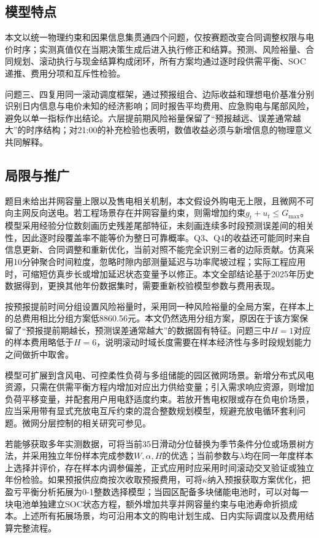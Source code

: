 

\subsection{模型特点}
本文以统一物理约束和因果信息集贯通四个问题，仅按赛题改变合同调整权限与电价时序；实测真值仅在当期决策生成后进入执行修正和结算。预测、风险裕量、合同规划、滚动执行与现金结算构成闭环，所有方案均通过逐时段供需平衡、SOC递推、费用分项和互斥性检验。

问题三、四复用同一滚动调度框架，通过预报组合、边际收益和理想电价基准分别识别日内信息与电价未知的经济影响；同时报告平均费用、应急购电与尾部风险，避免以单一指标作出结论。六层提前期风险裕量保留了“预报越远、误差通常越大”的时序结构；对21:00的补充检验也表明，数值收益必须与新增信息的物理意义共同解释。

\subsection{局限与推广}
题目未给出并网容量上限以及售电相关机制，本文假设外购电无上限，且微网不可向主网反向送电。若工程场景存在并网容量约束，则需增加约束$g_t+u_t \le G_{\text{max}}$。模型采用经验分位数刻画历史残差尾部特征，未刻画连续多时段预测误差间的相关性，因此逐时段覆盖率不能等价为整日可靠概率。Q3、Q4的收益还可能同时来自信息更新、合同调整和重新优化，当前对照不能完全识别三者的边际贡献。仿真采用10分钟聚合时间粒度，忽略时隙内部测量延迟与功率爬坡过程；实际工程应用时，可缩短仿真步长或增加延迟状态变量予以修正。本文全部结论基于2025年历史数据得到，更换其他年份数据集时，需要重新校验模型参数与费用表现。

按预报提前时间分组设置风险裕量时，采用同一种风险裕量的全局方案，在样本上的总费用相比分组方案低8860.56元。本文仍然选用分组方案，原因在于该方案保留了“预报提前期越长，预测误差通常越大”的数据固有特征。问题三中$H=1$对应的样本费用略低于$H=6$，说明滚动时域长度需要在样本经济性与多时段规划能力之间做折中取舍。

模型可扩展到含风电、可控柔性负荷与多组储能的园区微网场景。新增分布式风电资源，只需在供需平衡方程内增加对应出力供给变量；引入需求响应资源，则增加负荷平移变量，并配套用户用电舒适度约束。若放开售电权限或存在负电价场景，应当采用带有显式充放电互斥约束的混合整数规划模型，规避充放电循环套利问题。微网分层控制的相关研究可参见\cite{bouzid2015microgrid}。

若能够获取多年实测数据，可将当前35日滑动分位替换为季节条件分位或场景树方法，并采用独立年份样本完成参数$W,\alpha,H$的优选；当前参数与$\lambda$均在同一年度样本上选择并评价，存在样本内调参偏差，正式应用时应采用时间滚动交叉验证或独立年份检验。如果预报供应商按次收取预报费用，可将$\kappa$纳入预报获取方案优化，把盈亏平衡分析拓展为0-1整数选择模型；当园区配备多块储能电池时，可以对每一块电池单独建立SOC状态方程，额外增加共享并网容量约束与电池寿命折损成本。上述所有拓展场景，均可沿用本文的购电计划生成、日内实际调度以及费用结算完整流程。
